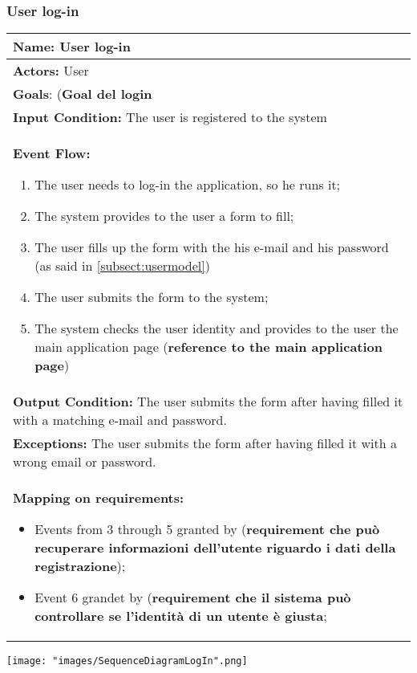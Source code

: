 \subsubsection{User log-in}
\begin{tabular}{|p{14cm}|} \hline

\textbf{Name:} User log-in \\ \hline
\textbf{Actors:} User \\ \hline
\textbf{Goals}: (\textbf{Goal del login} \\ \hline
\textbf{Input Condition:} The user is registered to the system \\ \hline
\textbf{Event Flow:} 
\begin{enumerate}
\item The user needs to log-in the application, so he runs it;
\item The system provides to the user a form to fill;
\item The user fills up the form with the his e-mail and his password (as said in \ref{subsect:usermodel})
\item The user submits the form to the system;
\item The system checks the user identity and provides to the user the main application page (\textbf{reference to the main application page})
\end{enumerate} \\ \hline

\textbf{Output Condition:} The user submits the form after having filled it with a matching e-mail and password. \\ \hline

\textbf{Exceptions:} The user submits the form after having filled it with a wrong email or password. \\ \hline

\textbf{Mapping on requirements:}
\begin{itemize}
\item Events from 3 through 5 granted by (\textbf{requirement che può recuperare informazioni dell'utente riguardo i dati della registrazione});
\item Event 6 grandet by (\textbf{requirement che il sistema può controllare se l'identità di un utente è giusta};
\end{itemize} \\ \hline

\end{tabular}

\texttt{[image: "images/SequenceDiagramLogIn".png]}

